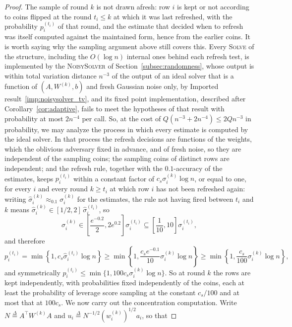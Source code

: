 \documentclass[11pt]{article}
\newcommand{\defeq}{\stackrel{\Delta}{=}}
\begin{document}
\begin{proof}
The sample of round $k$ is not drawn afresh: row
$i$ is kept or not according to coins flipped at the round
$t_i \le k$ at which it was last refreshed, with the probability
$p_i^{(t_i)}$ of that round, and the estimate that decided when to refresh was
itself computed against the maintained form, hence from the earlier coins.
It is worth saying why the sampling argument above still covers this.
Every \textsc{Solve} of the structure, including the $O(\log n)$ internal ones
behind each refresh test, is implemented by the \textsc{NoisySolver} of
Section~\ref{subsec:randomness}, whose output is within total variation distance
$n^{-3}$ of the output of an ideal solver that is a function of
$(A, W^{(k)}, b)$ and fresh Gaussian noise only, by Imported
result~\ref{imp:noisysolver_tv}, and its fixed point implementation, described
after Corollary~\ref{cor:adaptive}, fails to meet the hypotheses of that result
with probability at most $2 n^{-4}$ per call.
So, at the cost of $Q (n^{-3} + 2 n^{-4}) \le 2 Q n^{-3}$ in probability, we may
analyze the process in which every estimate is computed by the ideal solver.
In that process the refresh decisions are functions of the weights, which the
oblivious adversary fixed in advance, and of fresh noise, so they are
independent of the sampling coins; the sampling coins of distinct rows are
independent; and the refresh rule, together with the $0.1$-accuracy of the
estimates, keeps $p_i^{(t_i)}$ within a constant factor of
$c_s \sigma^{(k)}_i \log n$, or equal to one, for every
$i$ and every round
$k \ge t_i$ at which row
$i$ has not been refreshed again: writing
$\widehat{\sigma}^{(k)}_i \approx_{0.1} \sigma^{(k)}_i$ for the estimates, the
rule not having fired between $t_i$ and
$k$ means
$\widehat{\sigma}^{(k)}_i \in [1/2, 2] \, \widehat{\sigma}^{(t_i)}_i$, so
\[
\sigma^{(k)}_i
\in
\left[ \frac{e^{-0.2}}{2}, 2 e^{0.2} \right] \sigma^{(t_i)}_i
\subseteq
\left[ \frac{1}{10}, 10 \right] \sigma^{(t_i)}_i ,
\]
and therefore
\[
p_i^{(t_i)}
=
\min\left\{ 1, c_s \widehat{\sigma}^{(t_i)}_i \log n \right\}
\ge
\min\left\{ 1, \frac{c_s e^{-0.1}}{10} \sigma^{(k)}_i \log n \right\}
\ge
\min\left\{ 1, \frac{c_s}{100} \sigma^{(k)}_i \log n \right\} ,
\]
and symmetrically $p_i^{(t_i)} \le \min\{1, 100 c_s \sigma^{(k)}_i \log n\}$.
So at round $k$ the rows are kept independently, with probabilities fixed
independently of the coins, each at least the probability of leverage score
sampling at the constant $c_s / 100$ and at most that at
$100 c_s$.
We now carry out the concentration computation.
Write $N \defeq A^\top W^{(k)} A$ and
$u_i \defeq N^{-1/2} (w^{(k)}_i)^{1/2} a_i$, so that

\end{proof}
\end{document}

